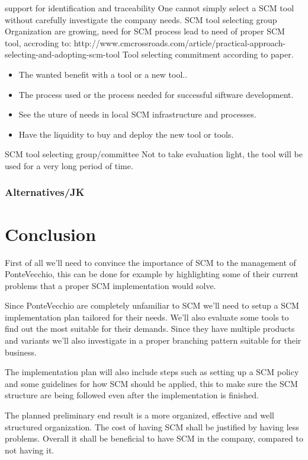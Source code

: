 \documentclass[10pt]{article}
\begin{document}
support for identification and traceability
One cannot simply select a SCM tool without carefully investigate the company needs.
SCM tool selecting group
Organization are growing, need for SCM process lead to need of proper SCM tool,  accroding to: http://www.cmcrossroads.com/article/practical-approach-selecting-and-adopting-scm-tool
Tool selecting commitment according to paper. 
\begin{itemize}
\item The wanted benefit with a tool or a new tool..
\item The process used or the process needed for successful siftware development.
\item See the uture of needs in local SCM infrastructure and processes.
\item Have the liquidity to buy and deploy the new tool or tools.
\end{itemize}
SCM tool selecting group/committee
Not to take evaluation light, the tool will be used for a very long period of time.
\subsubsection{Alternatives/JK}

\section{Conclusion}

First of all we’ll need to convince the importance of SCM to the management of PonteVecchio, this can be done for example by highlighting some of their current problems that a proper SCM implementation would solve.

\noindent Since PonteVecchio are completely unfamiliar to SCM we’ll need to setup a SCM implementation plan tailored for their needs. We’ll also evaluate some tools to find out the most suitable for their demands. 
Since they have multiple products and variants we’ll also investigate in a proper branching pattern suitable for their business.

\noindent The implementation plan will also include steps such as setting up a SCM policy and some guidelines for how SCM should be applied, this to make sure the SCM structure are being followed even after the implementation is finished.

\noindent The planned preliminary end result is a more organized, effective and well structured organization. The cost of having SCM shall be justified by having less problems. Overall it shall be beneficial to have SCM in the company, compared to not having it.
\end{document}
